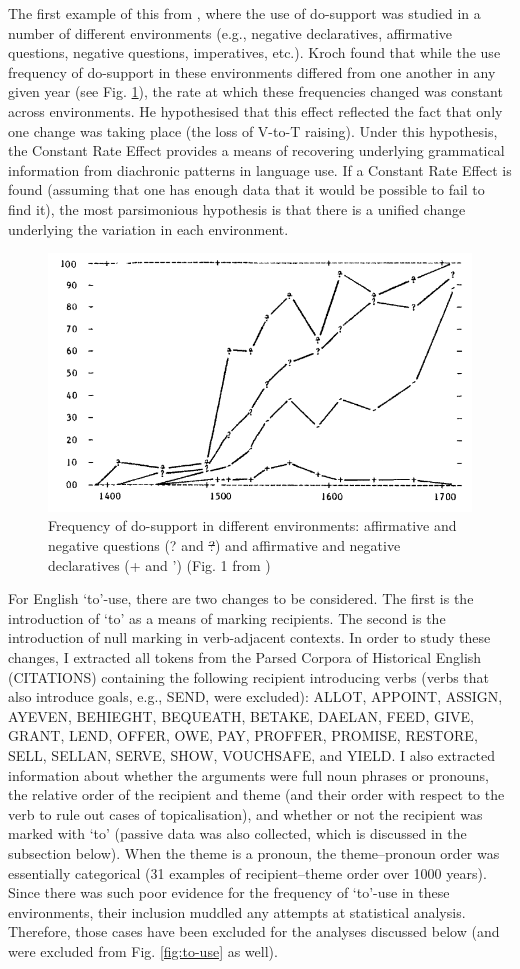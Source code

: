 	The first example of this from \cite{Kroch.1989}, where the use of do-support was studied in a number of different environments (e.g., negative declaratives, affirmative questions, negative questions, imperatives, etc.). Kroch found that while the use frequency of do-support in these environments differed from one another in any given year (see Fig. \ref{fig:kroch-graph}), the rate at which these frequencies changed was constant across environments. He hypothesised that this effect reflected the fact that only one change was taking place (the loss of V-to-T raising). Under this hypothesis, the Constant Rate Effect provides a means of recovering underlying grammatical information from diachronic patterns in language use. If a Constant Rate Effect is found (assuming that one has enough data that it would be possible to fail to find it), the most parsimonious hypothesis is that there is a unified change underlying the variation in each environment.

	\begin{figure}[ht!]
		\includegraphics[width=.5\linewidth]{../images/kroch-graph}
		\caption{Frequency of do-support in different environments: affirmative and negative questions (? and \sout{?}) and affirmative and negative declaratives (+ and ') (Fig. 1 from \citealt{Kroch.1989})}
		\label{fig:kroch-graph}
	\end{figure}

	For English `to'-use, there are two changes to be considered. The first is the introduction of `to' as a means of marking recipients. The second is the introduction of null marking in verb-adjacent contexts. In order to study these changes, I extracted all tokens from the Parsed Corpora of Historical English (CITATIONS) containing the following recipient introducing verbs (verbs that also introduce goals, e.g., SEND, were excluded): ALLOT, APPOINT, ASSIGN, AYEVEN, BEHIEGHT, BEQUEATH, BETAKE, DAELAN, FEED, GIVE, GRANT, LEND, OFFER, OWE, PAY, PROFFER, PROMISE, RESTORE, SELL, SELLAN, SERVE, SHOW, VOUCHSAFE, and YIELD. I also extracted information about whether the arguments were full noun phrases or pronouns, the relative order of the recipient and theme (and their order with respect to the verb to rule out cases of topicalisation), and whether or not the recipient was marked with `to' (passive data was also collected, which is discussed in the subsection below). When the theme is a pronoun, the theme--pronoun order was essentially categorical (31 examples of recipient--theme order over 1000 years). Since there was such poor evidence for the frequency of `to'-use in these environments, their inclusion muddled any attempts at statistical analysis. Therefore, those cases have been excluded for the analyses discussed below (and were excluded from Fig. \ref{fig:to-use} as well).

